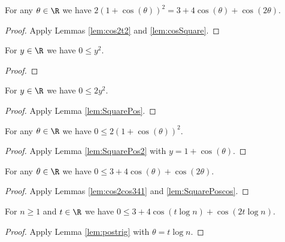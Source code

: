 \begin{lemma}\label{lem:cos2cos341}  \leanok
For any $\theta\in\R$ we have $2(1+\cos(\theta))^2 = 3+4\cos(\theta)+\cos(2\theta)$.
\end{lemma}
\begin{proof} \leanok {}
Apply Lemmas \ref{lem:cos2t2} and \ref{lem:cosSquare}.
\end{proof}

\begin{lemma}\label{lem:SquarePos}  \leanok
For $y\in\R$ we have $0\le y^2$.
\end{lemma}
\begin{proof} \leanok
\end{proof}

\begin{lemma}\label{lem:SquarePos2}  \leanok
For $y\in\R$ we have $0\le 2y^2$.
\end{lemma}
\begin{proof} \leanok {}
Apply Lemma \ref{lem:SquarePos}.
\end{proof}

\begin{lemma}\label{lem:SquarePoscos}  \leanok
For any $\theta\in\R$ we have $0\le 2(1+\cos(\theta))^2$.
\end{lemma}
\begin{proof} \leanok {}
Apply Lemma \ref{lem:SquarePos2} with $y=1+\cos(\theta)$.
\end{proof}

\begin{lemma}\label{lem:postrig}  \leanok
For any $\theta\in\R$ we have $0\le 3+4\cos(\theta)+\cos(2\theta)$.
\end{lemma}
\begin{proof} \leanok {}
Apply Lemmas \ref{lem:cos2cos341} and \ref{lem:SquarePoscos}.
\end{proof}


\begin{lemma}\label{lem:postriglogn}  \leanok
For $n\ge1$ and $t\in\R$ we have $0\le 3+4\cos(t\log n)+\cos(2t\log n)$.
\end{lemma}
\begin{proof} \leanok {}
Apply Lemma \ref{lem:postrig} with $\theta=t\log n$.
\end{proof}


